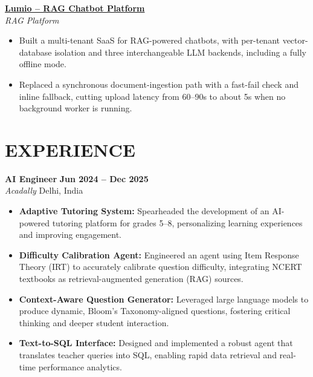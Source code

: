 \documentclass[10pt,a4paper]{article}
\begin{document}
\vspace{4pt}

\href{https://aniketsingh12.github.io/AI-enginer-protfolio/#project-04}{\textbf{Lumio -- RAG Chatbot Platform}} \\
\textit{RAG Platform}
\begin{itemize}[leftmargin=*,noitemsep,topsep=1pt]
    \item Built a multi-tenant SaaS for RAG-powered chatbots, with per-tenant vector-database isolation and three interchangeable LLM backends, including a fully offline mode.
    \item Replaced a synchronous document-ingestion path with a fast-fail check and inline fallback, cutting upload latency from 60--90s to about 5s when no background worker is running.
\end{itemize}

\vspace{4pt}

\section{EXPERIENCE}

\textbf{AI Engineer} \hfill \textbf{Jun 2024 -- Dec 2025} \\
\textit{Acadally} \hfill Delhi, India \\
\begin{itemize}[leftmargin=*,noitemsep,topsep=0pt,partopsep=0pt]
    \item \textbf{Adaptive Tutoring System:} Spearheaded the development of an AI-powered tutoring platform for grades 5--8, personalizing learning experiences and improving engagement.
    \item \textbf{Difficulty Calibration Agent:} Engineered an agent using Item Response Theory (IRT) to accurately calibrate question difficulty, integrating NCERT textbooks as retrieval-augmented generation (RAG) sources.
    \item \textbf{Context-Aware Question Generator:} Leveraged large language models to produce dynamic, Bloom's Taxonomy-aligned questions, fostering critical thinking and deeper student interaction.
    \item \textbf{Text-to-SQL Interface:} Designed and implemented a robust agent that translates teacher queries into SQL, enabling rapid data retrieval and real-time performance analytics.
\end{itemize}

\vspace{4pt}
\end{document}
